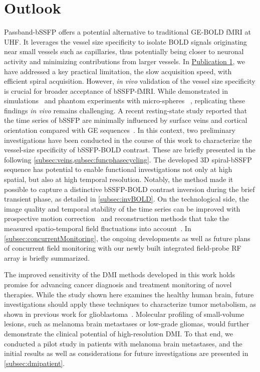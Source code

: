 \section{Outlook}
\label{sec:outlook}
Passband-\gls{bSSFP} offers a potential alternative to traditional \gls{GE}-\gls{BOLD} \gls{fMRI} at \gls{UHF}. It leverages the vessel size specificity to isolate \gls{BOLD} signals originating near small vessels such as capillaries, thus potentially being closer to neuronal activity and minimizing contributions from larger vessels.  In \hyperref[sec:paper1]{Publication 1}, we have addressed a key practical limitation, the slow acquisition speed, with efficient spiral acquisition. However, \textit{in vivo} validation of the vessel size specificity is crucial for broader acceptance of \gls{bSSFP}-\gls{fMRI}. While demonstrated in simulations~\cite{baez-yanezImpactVesselSize2017} and phantom experiments with micro-spheres ~\cite{schefflerBOLDSensitivityRapid2019}, replicating these findings \textit{in vivo} remains challenging. A recent resting-state study reported that the time series of \gls{bSSFP} are minimally influenced by surface veins and cortical orientation compared with \gls{GE} sequences~\cite{ramadanMacrovascularContributionsRestingstate2025}. In this context, two preliminary investigations have been conducted in the course of this work to characterize the vessel-size specificity of \gls{bSSFP}-\gls{BOLD} contrast. These are briefly presented in the following \cref{subsec:veins,subsec:funcphasecycling}. The developed 3D spiral-\gls{bSSFP} sequence has potential to enable functional investigations not only at high spatial, but also at high temporal resolution. Notably, the method made it possible to capture a distinctive \gls{bSSFP}-\gls{BOLD} contrast inversion during the brief transient phase, as detailed in \cref{subsec:invBOLD}. On the technological side, the image quality and temporal stability of the time series can be improved with prospective motion correction~\cite{zaitsevProspectiveMotionCorrection2017} and reconstruction methods that take the measured spatio-temporal field fluctuations into account~\cite{graedelFeasibilitySpiralFMRI2021,vannesjoImageReconstructionUsing2016}. In \cref{subsec:concurrentMonitoring}, the ongoing developments as well as future plans of concurrent field monitoring with our newly built integrated field-probe \gls{RF} array is briefly summarized.

The improved sensitivity of the \gls{DMI} methods developed in this work holds promise for advancing cancer diagnosis and treatment monitoring of novel therapies. While the study shown here examines the healthy human brain, future investigations should apply these techniques to characterize tumor metabolism, as shown in previous work for glioblastoma~\cite{defeyterDeuteriumMetabolicImaging2018}. Molecular profiling of small-volume lesions, such as melanoma brain metastases or low-grade gliomas, would further demonstrate the clinical potential of high-resolution \gls{DMI}. To that end, we conducted a pilot study in patients with melanoma brain metastases, and the initial results as well as considerations for future investigations are presented in \cref{subsec:dmipatient}. 

